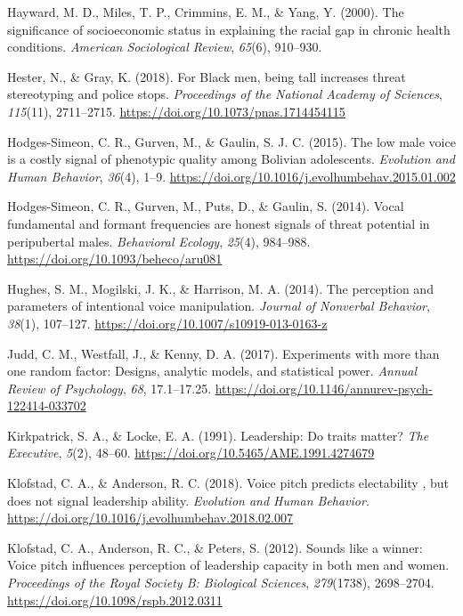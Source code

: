 \documentclass[
  english,
  man]{apa6}
\begin{document}
\leavevmode\hypertarget{ref-Hayward2000}{}%
Hayward, M. D., Miles, T. P., Crimmins, E. M., \& Yang, Y. (2000). The significance of socioeconomic status in explaining the racial gap in chronic health conditions. \emph{American Sociological Review}, \emph{65}(6), 910--930.

\leavevmode\hypertarget{ref-Hester2018}{}%
Hester, N., \& Gray, K. (2018). For Black men, being tall increases threat stereotyping and police stops. \emph{Proceedings of the National Academy of Sciences}, \emph{115}(11), 2711--2715. \url{https://doi.org/10.1073/pnas.1714454115}

\leavevmode\hypertarget{ref-Hodges-Simeon2015}{}%
Hodges-Simeon, C. R., Gurven, M., \& Gaulin, S. J. C. (2015). The low male voice is a costly signal of phenotypic quality among Bolivian adolescents. \emph{Evolution and Human Behavior}, \emph{36}(4), 1--9. \url{https://doi.org/10.1016/j.evolhumbehav.2015.01.002}

\leavevmode\hypertarget{ref-Hodges-Simeon2014}{}%
Hodges-Simeon, C. R., Gurven, M., Puts, D., \& Gaulin, S. (2014). Vocal fundamental and formant frequencies are honest signals of threat potential in peripubertal males. \emph{Behavioral Ecology}, \emph{25}(4), 984--988. \url{https://doi.org/10.1093/beheco/aru081}

\leavevmode\hypertarget{ref-Hughes2014}{}%
Hughes, S. M., Mogilski, J. K., \& Harrison, M. A. (2014). The perception and parameters of intentional voice manipulation. \emph{Journal of Nonverbal Behavior}, \emph{38}(1), 107--127. \url{https://doi.org/10.1007/s10919-013-0163-z}

\leavevmode\hypertarget{ref-Judd2017}{}%
Judd, C. M., Westfall, J., \& Kenny, D. A. (2017). Experiments with more than one random factor: Designs, analytic models, and statistical power. \emph{Annual Review of Psychology}, \emph{68}, 17.1--17.25. \url{https://doi.org/10.1146/annurev-psych-122414-033702}

\leavevmode\hypertarget{ref-Kirkpatrick1991}{}%
Kirkpatrick, S. A., \& Locke, E. A. (1991). Leadership: Do traits matter? \emph{The Executive}, \emph{5}(2), 48--60. \url{https://doi.org/10.5465/AME.1991.4274679}

\leavevmode\hypertarget{ref-Klofstad2018}{}%
Klofstad, C. A., \& Anderson, R. C. (2018). Voice pitch predicts electability , but does not signal leadership ability. \emph{Evolution and Human Behavior}. \url{https://doi.org/10.1016/j.evolhumbehav.2018.02.007}

\leavevmode\hypertarget{ref-Klofstad2012}{}%
Klofstad, C. A., Anderson, R. C., \& Peters, S. (2012). Sounds like a winner: Voice pitch influences perception of leadership capacity in both men and women. \emph{Proceedings of the Royal Society B: Biological Sciences}, \emph{279}(1738), 2698--2704. \url{https://doi.org/10.1098/rspb.2012.0311}
\end{document}
